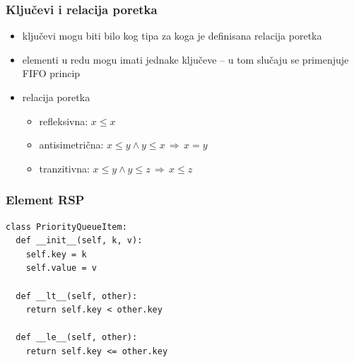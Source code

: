 \documentclass[compress]{beamer}
\begin{document}
\begin{frame}[fragile]
  \frametitle{Ključevi i relacija poretka}
  \begin{itemize}
    \item ključevi mogu biti bilo kog tipa za koga je definisana relacija poretka
    \item elementi u redu mogu imati jednake ključeve -- u tom slučaju se primenjuje FIFO princip
    \item relacija poretka
    \begin{itemize}
      \item refleksivna: $x\leq x$
      \item antisimetrična: $x\leq y \land y\leq x \, \Rightarrow \, x = y$
      \item tranzitivna: $x\leq y \land y\leq z \, \Rightarrow \, x\leq z$
    \end{itemize}
  \end{itemize}
\end{frame}

\begin{frame}
  \frametitle{Element RSP}
\begin{verbatim}
class PriorityQueueItem:
  def __init__(self, k, v):
    self.key = k
    self.value = v
    
  def __lt__(self, other):
    return self.key < other.key
    
  def __le__(self, other):
    return self.key <= other.key
\end{verbatim}
\end{frame}
\end{document}

